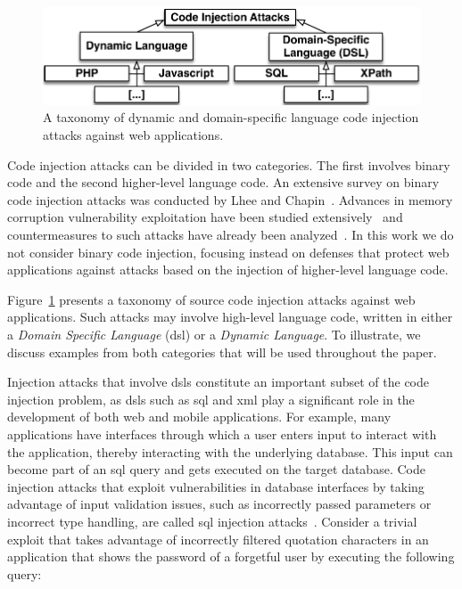 \documentclass[10pt,journal,compsoc]{IEEEtran}
\begin{document}
\begin{figure}
\begin{center}
\leavevmode
\includegraphics[scale=0.52]{attack-tree-uml.pdf}
\end{center}
\vspace{-6mm}
\caption{\label{fig:taxonomy}A taxonomy of dynamic and domain-specific
language code injection attacks against web applications.}
\vspace{-6.5mm}
\end{figure}

Code injection attacks can be divided in two categories. The first
involves binary code and the second higher-level language code. An
extensive survey on binary code injection attacks was conducted by
Lhee and Chapin~\cite{LC03}. Advances in memory corruption vulnerability
exploitation have been studied extensively~\cite{SPWS13}
and countermeasures to such attacks
have already been analyzed~\cite{YJP12}.
In this work we do not consider binary code injection,
focusing instead on defenses
that protect web applications against attacks based on the
injection of higher-level language code.

Figure~\ref{fig:taxonomy} presents a taxonomy of source
code injection attacks against web applications.
Such attacks may involve high-level language code, written in either a
{\it Domain Specific Language} ({\sc dsl}) or a {\it Dynamic Language}.
To illustrate, we discuss examples from both categories
that will be used throughout the paper.

Injection attacks that involve {\sc dsl}s constitute an important
subset of the code injection problem, as {\sc dsl}s such as
{\sc sql} and {\sc xml} play a significant role in the development of
both web and mobile applications. For example, many applications have
interfaces through which a user enters input to interact with the
application, thereby interacting with the underlying database. This
input can become part of an {\sc sql} query and gets executed on the
target database. Code injection attacks that exploit vulnerabilities
in database interfaces by taking advantage of input validation issues,
such as incorrectly passed parameters or incorrect type handling, are
called {\sc sql} injection attacks~\cite{HVO06,SW06}.
Consider a trivial exploit that takes advantage of incorrectly
filtered quotation characters in an application that shows the
password of a forgetful user by executing the following
query:
\end{document}

